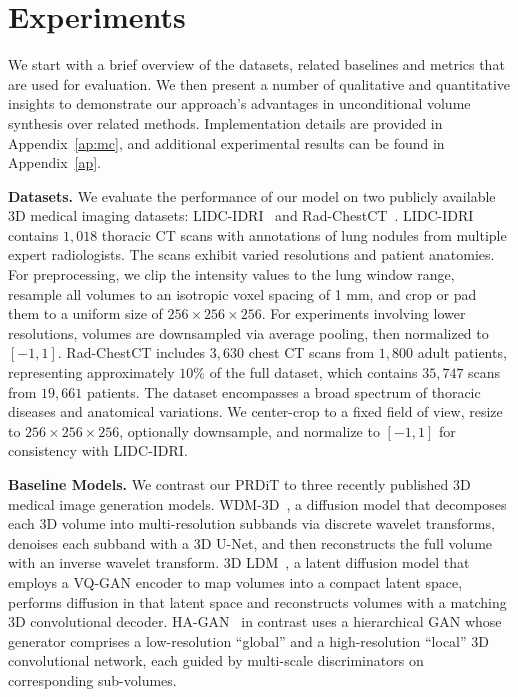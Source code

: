 \section{Experiments}
We start with a brief overview of the datasets, related baselines and metrics that are used for evaluation. We then present a number of qualitative and quantitative insights to demonstrate our approach’s advantages in unconditional volume synthesis over related methods. Implementation details are provided in Appendix~\ref{ap:mc}, and additional experimental results can be found in Appendix~\ref{ap}.

\textbf{Datasets.}\;\; We evaluate the performance of our model on two publicly available 3D medical imaging datasets: LIDC-IDRI~\citep{armato2011lung} and Rad-ChestCT~\citep{draelos2020rad}. LIDC-IDRI contains $1{,}018$ thoracic CT scans with annotations of lung nodules from multiple expert radiologists. The scans exhibit varied resolutions and patient anatomies. For preprocessing, we clip the intensity values to the lung window range, resample all volumes to an isotropic voxel spacing of 1 mm, and crop or pad them to a uniform size of $256\!\times\!256\!\times 256$. For experiments involving lower resolutions, volumes are downsampled via average pooling, then normalized to $[-1,1]$. Rad-ChestCT includes $3{,}630$ chest CT scans from $1{,}800$ adult patients, representing approximately $10\%$ of the full dataset, which contains $35{,}747$ scans from $19{,}661$ patients. The dataset encompasses a broad spectrum of thoracic diseases and anatomical variations. We center-crop to a fixed field of view, resize to $256\!\times256\!\times\!256$, optionally downsample, and normalize to $[-1,1]$ for consistency with LIDC-IDRI. %

\textbf{Baseline Models.}\;\; We contrast our PRDiT to three recently published 3D medical image generation models. WDM-3D~\citep{friedrich2024wdm}, a diffusion model that decomposes each 3D volume into multi-resolution subbands via discrete wavelet transforms, denoises each subband with a 3D U-Net, and then reconstructs the full volume with an inverse wavelet transform. 3D LDM~\citep{khader2023medical}, a latent diffusion model that employs a VQ-GAN encoder to map volumes into a compact latent space, performs diffusion in that latent space and reconstructs volumes with a matching 3D convolutional decoder. HA-GAN~\citep{sun2022hierarchical} in contrast uses a hierarchical GAN whose generator comprises a low-resolution “global” and a high-resolution “local” 3D convolutional network, each guided by multi-scale discriminators on corresponding sub-volumes. 

